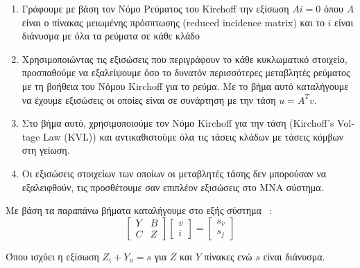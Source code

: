 \begin{enumerate}
    \item Γράφουμε με βάση τον Νόμο Ρεύματος του \textlatin{Kirchoff} την εξίσωση $Ai=0$ όπου $A$ είναι ο πίνακας μειωμένης πρόσπτωσης (\textlatin{reduced incidence matrix}) και το $i$ είναι διάνυσμα με όλα τα ρεύματα σε κάθε κλάδο
    \item Χρησιμοποιώντας τις εξισώσεις που περιγράφουν το κάθε κυκλωματικό στοιχείο, προσπαθούμε να εξαλείψουμε όσο το δυνατόν περισσότερες μεταβλητές ρεύματος με τη βοήθεια του Νόμου \textlatin{Kirchoff} για το ρεύμα. Με το βήμα αυτό καταλήγουμε να έχουμε εξισώσεις οι οποίες είναι σε συνάρτηση με την τάση $u = A^T v$.
    \item Στο βήμα αυτό, χρησιμοποιούμε τον Νόμο \textlatin{Kirchoff} για την τάση (\textlatin{Kirchoff's Voltage Law (KVL)}) και αντικαθιστούμε όλα τις τάσεις κλάδων με τάσεις κόμβων στη γείωση.
    \item Οι εξισώσεις στοιχείων των οποίων οι μεταβλητές τάσης δεν μπορούσαν να εξαλειφθούν, τις προσθέτουμε σαν επιπλέον εξισώσεις στο \textlatin{MNA} σύστημα.
\end{enumerate}

Με βάση τα παραπάνω βήματα καταλήγουμε στο εξής σύστημα ~\cite{ho1975modified}:
\begin{equation}
    \begin{bmatrix}
    Y & B\\
    C & Z
    \end{bmatrix}
    \begin{bmatrix}
    v\\
    i
    \end{bmatrix} = 
    \begin{bmatrix}
    s_v\\
    s_j
    \end{bmatrix}
\end{equation}


Όπου ισχύει η εξίσωση $Z_i + Y_u = s$ για $Z$ και $Y$ πίνακες ενώ $s$ είναι διάνυσμα.



